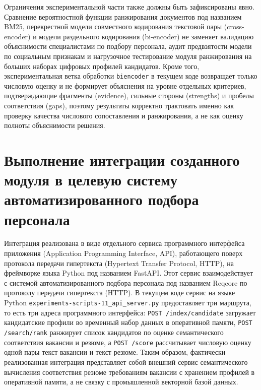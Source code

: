 Ограничения экспериментальной части также должны быть зафиксированы явно. Сравнение вероятностной функции ранжирования документов под названием BM25, перекрестной модели совместного кодирования текстовой пары (cross-encoder) и модели раздельного кодирования (bi-encoder) не заменяет валидацию объяснимости специалистами по подбору персонала, аудит предвзятости модели по социальным признакам и нагрузочное тестирование модуля ранжирования на больших наборах цифровых профилей кандидатов. Кроме того, экспериментальная ветка обработки \texttt{biencoder} в текущем коде возвращает только числовую оценку и не формирует объяснения на уровне отдельных критериев, подтверждающие фрагменты (evidence), сильные стороны (strengths) и пробелы соответствия (gaps), поэтому результаты корректно трактовать именно как проверку качества числового сопоставления и ранжирования, а не как оценку полноты объяснимости решения.

\section{Выполнение интеграции созданного модуля в целевую систему автоматизированного подбора персонала}

Интеграция реализована в виде отдельного сервиса программного интерфейса приложения (Application Programming Interface, API), работающего поверх протокола передачи гипертекста (Hypertext Transfer Protocol, HTTP), на фреймворке языка Python под названием FastAPI. Этот сервис взаимодействует с системой автоматизированного подбора персонала под названием Reqcore по протоколу передачи гипертекста (HTTP). В текущем коде сервис на языке Python \texttt{experiments-scripts-11\_api\_server.py} предоставляет три маршрута, то есть три адреса программного интерфейса: \texttt{POST {\slash}index{\slash}candidate} загружает кандидатские профили во временный набор данных в оперативной памяти, \texttt{POST {\slash}search{\slash}rank} ранжирует список кандидатов по оценке семантического соответствия вакансии и резюме, а \texttt{POST {\slash}score} рассчитывает числовую оценку одной пары текст вакансии и текст резюме. Таким образом, фактически реализованная интеграция представляет собой внешний сервис семантического вычисления соответствия резюме требованиям вакансии с хранением профилей в оперативной памяти, а не связку с промышленной векторной базой данных.


